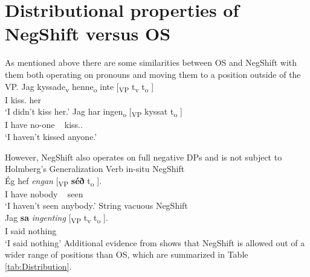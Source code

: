 \documentclass[12pt, letterpaper]{article}
\begin{document}
\section{Distributional properties of NegShift versus OS} \label{sec:ENGELS}

\ea As mentioned above there are some similarities between OS and NegShift with them both operating on pronouns and moving them to a position outside of the VP. 
	\ea \label{ex:OS}
		\gll Jag kyssade\textsubscript{v} henne\textsubscript{o} inte [\textsubscript{VP} t\textsubscript{v} t\textsubscript{o} ] \\
		I kiss.\Pst{} her \Neg{}\\
		\glt `I didn't kiss her.'
	\ex \label{ex:NS}
		\gll Jag har ingen\textsubscript{o} [\textsubscript{VP} kyssat t\textsubscript{o} ]\\
		I have no-one ~ kiss.\Pst{}.\Ptcp{} \\
		\glt `I haven't kissed anyone.'
	\z 
	
\ex However, NegShift also operates on full negative DPs and is not subject to Holmberg's Generalization \citep{foxCyclicLinearizationSyntactic2005,engelsScandinavianNegativeIndefinites2012}
		\ea Verb in-situ NegShift\\
		{\gll Ég hef \textit{engan} [\textsubscript{VP} \textbf{séð} t\textsubscript{o}	].\\
			I have nobody ~ seen\\}
		\glt `I haven't seen anybody.'
		\ex String vacuous NegShift\\
		{\gll Jag \textbf{sa} \textit{ingenting} [\textsubscript{VP} t\textsubscript{v}  t\textsubscript{o}  ].\\
			I said nothing\\}
		\glt `I said nothing'
		\z
\ex Additional evidence from \citet{engelsScandinavianNegativeIndefinites2012} shows that NegShift is allowed out of a wider range of positions than OS, which are summarized in Table \ref{tab:Distribution}.
\end{document}
